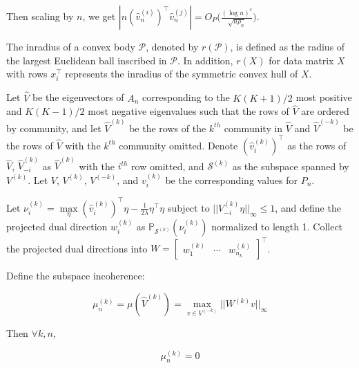 \documentclass[
  12pt,
]{article}
\begin{document}
Then scaling by \(n\), we get
\(|n (\hat{v}_n^{(i)})^\top \hat{v}_n^{(j)}| = O_P \big( \frac{(\log n)^c}{\sqrt{n \rho_n}} \big)\).

\begin{definition}
The inradius of a convex body $\mathcal{P}$, denoted by $r(\mathcal{P})$, is 
defined as the radius of the largest Euclidean ball inscribed in $\mathcal{P}$.
In addition, $r(X)$ for data matrix $X$ with rows $x_i^\top$ represents 
the inradius of the symmetric convex hull of $X$. 
\end{definition}

\begin{definition}
\end{definition}

\begin{lemma}
\label{lemma2}
Let $\hat{V}$ be the eigenvectors of $A_n$ corresponding to the $K (K + 1) / 2$ most positive and $K (K - 1) / 2$ most negative eigenvalues such that the rows of $\hat{V}$ are ordered by community, and let $\hat{V}^{(k)}$ be the rows of the $k^{th}$ community in $\hat{V}$ and $\hat{V}^{(-k)}$ be the rows of $\hat{V}$ with the $k^{th}$ community omitted. Denote $(\hat{v}_i^{(k)})^\top$ as the rows of $\hat{V}$, $\hat{V}_{-i}^{(k)}$ as $\hat{V}^{(k)}$ with the $i^{th}$ row omitted, and $\mathcal{S}^{(k)}$ as the subspace spanned by $V^{(k)}$. Let $V$, $V^{(k)}$, $V^{(-k)}$, and $v_i^{(k)}$ be the corresponding values for $P_n$. 

Let $\nu_{i}^{(k)} = \max\limits_\eta (\hat{v}_i^{(k)})^\top \eta - \frac{1}{2 \lambda} \eta^\top \eta$ subject to $||V_{-i}^{(k)} \eta||_\infty \leq 1$, and define the projected dual direction $w_{i}^{(k)}$ as $\mathbb{P}_{\mathcal{S}^{(k)}}(\nu_i^{(k)})$ normalized to length 1. Collect the projected dual directions into $W = \begin{bmatrix} w_1^{(k)} & \cdots & w_{n_k}^{(k)} \end{bmatrix}^\top$.

Define the subspace incoherence:

$$\mu_n^{(k)} = \mu(\hat{V}^{(k)}) = \max\limits_{v \in V^{(-k)}} ||W^{(k)} v||_\infty$$

Then $\forall k, n$, 

\begin{equation} \label{eq:mu-conv}
\mu_n^{(k)} = 0
\end{equation}
\end{lemma}
\end{document}
